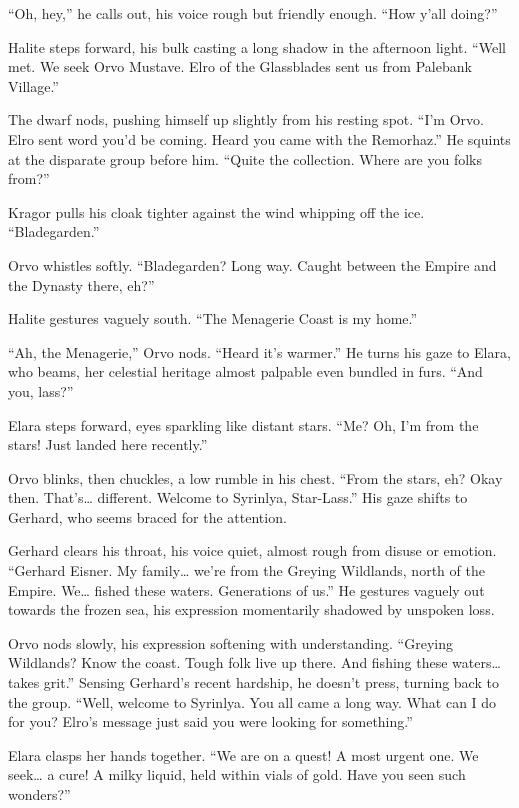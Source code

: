 \documentclass[
  letterpaper,12pt,twoside,twocolumn,openany,
  nodeprecatedcode,bg=full]{dndbook}
\begin{document}
``Oh, hey,'' he calls out, his voice rough but friendly enough. ``How
y'all doing?''

Halite steps forward, his bulk casting a long shadow in the afternoon
light. ``Well met. We seek Orvo Mustave. Elro of the Glassblades sent us
from Palebank Village.''

The dwarf nods, pushing himself up slightly from his resting spot. ``I'm
Orvo. Elro sent word you'd be coming. Heard you came with the
Remorhaz.'' He squints at the disparate group before him. ``Quite the
collection. Where are you folks from?''

Kragor pulls his cloak tighter against the wind whipping off the ice.
``Bladegarden.''

Orvo whistles softly. ``Bladegarden? Long way. Caught between the Empire
and the Dynasty there, eh?''

Halite gestures vaguely south. ``The Menagerie Coast is my home.''

``Ah, the Menagerie,'' Orvo nods. ``Heard it's warmer.'' He turns his
gaze to Elara, who beams, her celestial heritage almost palpable even
bundled in furs. ``And you, lass?''

Elara steps forward, eyes sparkling like distant stars. ``Me? Oh, I'm
from the stars! Just landed here recently.''

Orvo blinks, then chuckles, a low rumble in his chest. ``From the stars,
eh? Okay then. That's\ldots{} different. Welcome to Syrinlya,
Star-Lass.'' His gaze shifts to Gerhard, who seems braced for the
attention.

Gerhard clears his throat, his voice quiet, almost rough from disuse or
emotion. ``Gerhard Eisner. My family\ldots{} we're from the Greying
Wildlands, north of the Empire. We\ldots{} fished these waters.
Generations of us.'' He gestures vaguely out towards the frozen sea, his
expression momentarily shadowed by unspoken loss.

Orvo nods slowly, his expression softening with understanding. ``Greying
Wildlands? Know the coast. Tough folk live up there. And fishing these
waters\ldots{} takes grit.'' Sensing Gerhard's recent hardship, he
doesn't press, turning back to the group. ``Well, welcome to Syrinlya.
You all came a long way. What can I do for you? Elro's message just said
you were looking for something.''

Elara clasps her hands together. ``We are on a quest! A most urgent one.
We seek\ldots{} a cure! A milky liquid, held within vials of gold. Have
you seen such wonders?''
\end{document}
